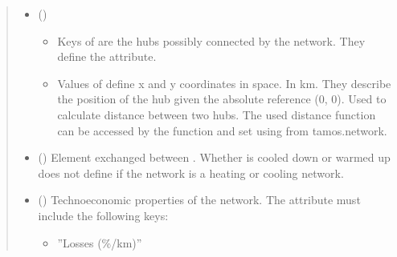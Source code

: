 \documentclass[letterpaper,10pt,english]{sphinxmanual}
\begin{document}
\begin{fulllineitems}
\begin{fulllineitems}
\begin{itemize}
\end{itemize}
\begin{quote}\begin{description}
\begin{itemize}
\item {} 
\sphinxAtStartPar
{} (\sphinxstyleliteralemphasis{\sphinxupquote{ (}}\sphinxstyleliteralemphasis{\sphinxupquote{, }}\sphinxstyleliteralemphasis{\sphinxupquote{)}}\sphinxstyleliteralemphasis{\sphinxupquote{\}}}) \textendash{} \begin{itemize}
\item {} 
\sphinxAtStartPar
Keys of  are the hubs possibly connected by the network.
They define the  attribute.

\item {} 
\sphinxAtStartPar
Values of  define x and y coordinates in space.
In km.
They describe the position of the hub given the absolute reference (0, 0).
Used to calculate distance between two hubs. The used distance function can be accessed by the
 function and set using  from tamos.network.

\end{itemize}


\item {} 
\sphinxAtStartPar
{} () \textendash{} Element exchanged between .
Whether  is cooled down or warmed up does not define if the network is a heating or cooling network.

\item {} 
\sphinxAtStartPar
{} (\sphinxstyleliteralemphasis{\sphinxupquote{ | }}) \textendash{} 
\sphinxAtStartPar
Techno\sphinxhyphen{}economic properties of the network.
The  attribute must include the following keys:
\begin{itemize}
\item {} 
\sphinxAtStartPar
”Losses (\%/km)”


\end{itemize}
\end{itemize}
\end{description}
\end{quote}
\end{fulllineitems}
\end{fulllineitems}
\end{document}
